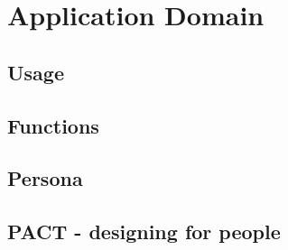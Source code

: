 \chapter{Application Domain}

\section{Usage}\label{usecase}


\section{Functions}


\section{Persona}


\section{PACT - designing for people}

